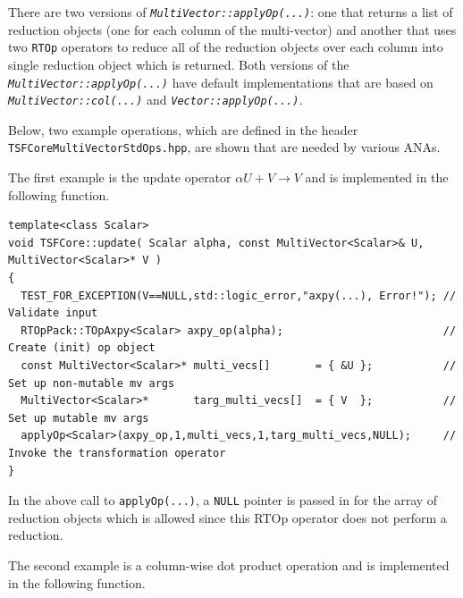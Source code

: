 There are two versions of
{}\texttt{\textit{Multi\-Vector\-::applyOp(\-...)}}: one that returns
a list of reduction objects (one for each column of the multi-vector)
and another that uses two {}\texttt{RTOp} operators to reduce all of
the reduction objects over each column into single reduction object
which is returned.  Both versions of the
{}\texttt{\textit{Multi\-Vector\-::applyOp(\-...)}} have default
implementations that are based on
{}\texttt{\textit{Multi\-Vector\-::col(...)}} and
{}\texttt{\textit{Vector\-::applyOp(\-...)}}.

Below, two example operations, which are defined in the header
{}\texttt{TSFCore\-Multi\-Vector\-Std\-Ops.hpp}, are shown that are
needed by various ANAs.

The first example is the update operator $\alpha U + V \rightarrow V$
and is implemented in the following function.

{\scriptsize\begin{verbatim}
template<class Scalar>
void TSFCore::update( Scalar alpha, const MultiVector<Scalar>& U, MultiVector<Scalar>* V )
{
  TEST_FOR_EXCEPTION(V==NULL,std::logic_error,"axpy(...), Error!"); // Validate input
  RTOpPack::TOpAxpy<Scalar> axpy_op(alpha);                         // Create (init) op object
  const MultiVector<Scalar>* multi_vecs[]       = { &U };           // Set up non-mutable mv args
  MultiVector<Scalar>*       targ_multi_vecs[]  = { V  };           // Set up mutable mv args
  applyOp<Scalar>(axpy_op,1,multi_vecs,1,targ_multi_vecs,NULL);     // Invoke the transformation operator
}
\end{verbatim}}

{}\noindent{}In the above call to {}\texttt{applyOp(\-...)}, a
{}\texttt{NULL} pointer is passed in for the array of reduction
objects which is allowed since this RTOp operator does not perform a
reduction.

The second example is a column-wise dot product operation and is
implemented in the following function.

